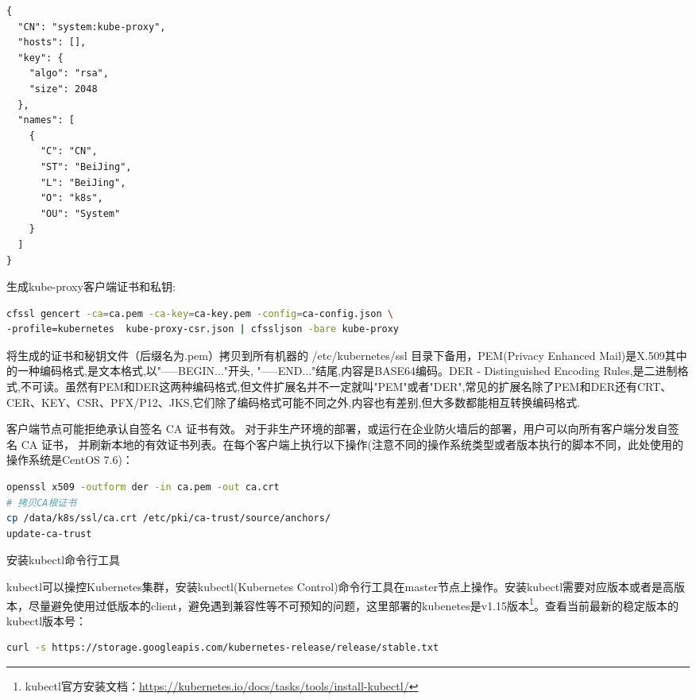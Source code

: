 \documentclass[8pt]{book}
\makeatletter
\numberwithin{dummy}{section}
\theoremstyle{ocrenumbox}
\theoremstyle{blacknumex}
\theoremstyle{blacknumbox}
\theoremstyle{ocrenum}
\renewcommand{\subsubsection}{\@startsection {subsubsection}{3}{\z@}
	{-2ex \@plus -0.1ex \@minus -.2ex}
	{.2ex \@plus.2ex }
	{\normalfont\small\sffamily\bfseries}}
\makeatother
\begin{document}
\begin{lstlisting}
{
  "CN": "system:kube-proxy",
  "hosts": [],
  "key": {
    "algo": "rsa",
    "size": 2048
  },
  "names": [
    {
      "C": "CN",
      "ST": "BeiJing",
      "L": "BeiJing",
      "O": "k8s",
      "OU": "System"
    }
  ]
}
\end{lstlisting}

生成kube-proxy客户端证书和私钥:

\begin{lstlisting}[language=Bash]
cfssl gencert -ca=ca.pem -ca-key=ca-key.pem -config=ca-config.json \
-profile=kubernetes  kube-proxy-csr.json | cfssljson -bare kube-proxy
\end{lstlisting}

将生成的证书和秘钥文件（后缀名为.pem）拷贝到所有机器的 /etc/kubernetes/ssl 目录下备用，PEM(Privacy Enhanced Mail)是X.509其中的一种编码格式,是文本格式,以"-----BEGIN..."开头, "-----END..."结尾,内容是BASE64编码。DER - Distinguished Encoding Rules,是二进制格式,不可读。虽然有PEM和DER这两种编码格式,但文件扩展名并不一定就叫"PEM"或者"DER",常见的扩展名除了PEM和DER还有CRT、CER、KEY、CSR、PFX/P12、JKS,它们除了编码格式可能不同之外,内容也有差别,但大多数都能相互转换编码格式.

客户端节点可能拒绝承认自签名 CA 证书有效。 对于非生产环境的部署，或运行在企业防火墙后的部署，用户可以向所有客户端分发自签名 CA 证书， 并刷新本地的有效证书列表。在每个客户端上执行以下操作(注意不同的操作系统类型或者版本执行的脚本不同，此处使用的操作系统是CentOS 7.6)：

\begin{lstlisting}[language=Bash]
openssl x509 -outform der -in ca.pem -out ca.crt
# 拷贝CA根证书
cp /data/k8s/ssl/ca.crt /etc/pki/ca-trust/source/anchors/
update-ca-trust
\end{lstlisting}



\subsubsection{安装kubectl命令行工具}

kubectl可以操控Kubernetes集群，安装kubectl(Kubernetes Control)命令行工具在master节点上操作。安装kubectl需要对应版本或者是高版本，尽量避免使用过低版本的client，避免遇到兼容性等不可预知的问题，这里部署的kubenetes是v1.15版本\footnote{kubectl官方安装文档：\url{https://kubernetes.io/docs/tasks/tools/install-kubectl/}}。查看当前最新的稳定版本的kubectl版本号：

\begin{lstlisting}[language=Bash]
curl -s https://storage.googleapis.com/kubernetes-release/release/stable.txt
\end{lstlisting}
\end{document}
